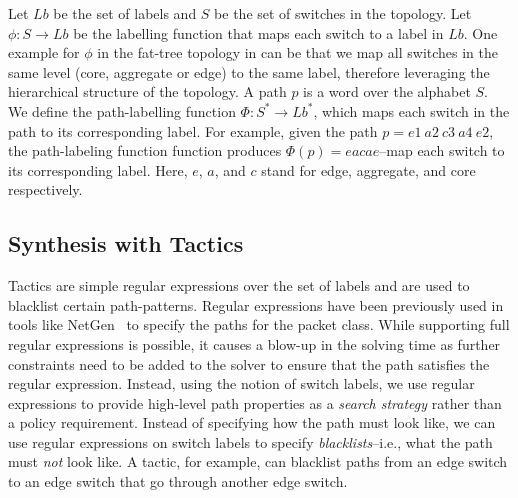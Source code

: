  Let $Lb$ be the set of labels and $S$ be the set of switches in the topology. Let $\phi : S \rightarrow Lb$ be the labelling function that maps each switch to a label in $Lb$. One example for $\phi$ in the fat-tree topology in  can be that we map all switches in the same level (core, aggregate or edge) to the same label,
therefore leveraging the hierarchical structure of the topology. A path $p$ is a word over the alphabet $S$. 
We define the path-labelling function $\Phi : S^* \rightarrow Lb^*$,  which maps each switch in the path to its corresponding 
 label. 
 For example, given the path $p = e1\ a2\ c3\ a4\ e2$, the path-labeling function function produces $\Phi(p) = eacae$--map each switch to its corresponding label.
 Here, $e$, $a$, and $c$ stand for edge, aggregate, and core respectively.

\subsection{Synthesis with Tactics}
Tactics are simple regular expressions over the set of labels and are used to blacklist certain path-patterns.
Regular expressions have been previously used in tools like
NetGen~\cite{netgen} to specify the paths for the packet class.
While supporting full regular expressions is possible, it causes a blow-up in the solving time as further
constraints need to be added to the solver to ensure that the path satisfies the regular expression. 
Instead, using the notion of switch labels, we use regular expressions to provide high-level path properties as a {\em search strategy} rather than a policy requirement. Instead of specifying how the path must look like, we can use regular expressions on switch labels to specify \emph{blacklists}--i.e.,
what the path must \emph{not} look like. A tactic, for example, can blacklist paths from an edge switch to an edge switch that go through another edge switch. 


